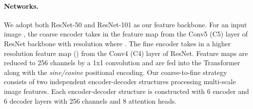 \documentclass[final]{cvpr}
\begin{document}
\paragraph{Networks.} We adopt both ResNet-50 and ResNet-101 as our feature backbone. For an input image , the coarse encoder takes in the feature map from the Conv5 (C5) layer of ResNet backbone with resolution  where . The fine encoder takes in a higher resolution feature map () from the Conv4 (C4) layer of ResNet. Feature maps are reduced to 256 channels by a 1x1 convolution and are fed into the Transformer along with the {\em sine/cosine} positional encoding. Our coarse-to-fine strategy consists of two independent encoder-decoder structures processing multi-scale image features. Each encoder-decoder structure is constructed with 6 encoder and 6 decoder layers with 256 channels and 8 attention heads.  
\vspace{-2mm}
\end{document}
